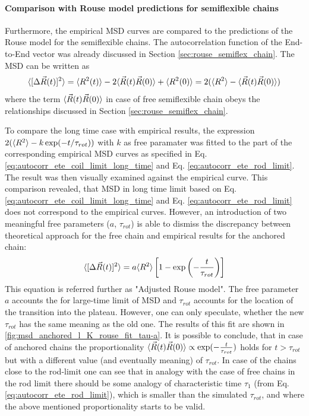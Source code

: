 \documentclass[
    paper=A4,pagesize=automedia,fontsize=12pt,
    BCOR=15mm,DIV=22,
    twoside,headinclude,footinclude=false,
    fleqn,             %
    bibliography=totocnumbered,          %
    listof=totoc,                %
    listof=flat,                 %
    cleardoublepage=empty      %
    numbers=endperiod
]{scrartcl}
\begin{document}
\FloatBarrier

\paragraph{Comparison with Rouse model predictions for semiflexible chains}
\label{sec:comp_with_rouse_semiflex}

Furthermore, the empirical MSD curves are compared to the predictions
of the Rouse model for the semiflexible chains. The autocorrelation function
of the End-to-End vector was already discussed in Section \ref{sec:rouse_semiflex_chain}.
The MSD can be written as 
$$\langle[\Delta \vec{R}(t)]^2\rangle = \langle R^2(t)\rangle - 2 \langle\vec{R}(t)\vec{R}(0)\rangle + \langle R^2(0)\rangle = 2(\langle R^2\rangle - \langle\vec{R}(t)\vec{R}(0)\rangle)$$
where the term $\langle\vec{R}(t)\vec{R}(0)\rangle$ in case of free semiflexible chain obeys 
the relationships discussed in Section \ref{sec:rouse_semiflex_chain}.

To compare the long time case with empirical results, the expression
$2(\langle R^2\rangle - k \exp(-t/\tau_{rot}))$ with $k$ as free paramater was fitted 
to the part of the corresponding empirical MSD curves as specified in 
Eq. \ref{eq:autocorr_ete_coil_limit_long_time} and Eq. \ref{eq:autocorr_ete_rod_limit}.
The result was then visually examined against the empirical curve.
This comparison revealed, that MSD in long time limit based on 
Eq. \ref{eq:autocorr_ete_coil_limit_long_time} and 
Eq. \ref{eq:autocorr_ete_rod_limit} does not correspond to the empirical curves.
However, an introduction of two meaningful free parameters 
($a$, $\tau_{rot}$) is able to dismiss
the discrepancy between theoretical approach for the free chain and empirical 
results for the anchored chain:
\begin{equation}
    \label{eq:adjusted_rouse_model_ete}
    \langle[\Delta \vec{R}(t)]^2\rangle  = a\langle R^2\rangle\left[1 - \exp\left(-\frac{t}{\tau_{rot}}\right)\right]
\end{equation}
This equation is referred further as "Adjusted Rouse model".
The free parameter $a$ accounts the for large-time limit of MSD and $\tau_{rot}$ 
accounts for the location of the transition into the plateau. However, one
can only speculate, whether the new $\tau_{rot}$ has the same meaning
as the old one. The results of this fit are shown in 
\autoref{fig:msd_anchored_l_K_rouse_fit_tau-a}.
It is possible to conclude, that in case of anchored chains the proportionality
$\langle\vec{R}(t)\vec{R}(0)\rangle \propto \exp(-\frac{t}{\tau_{rot}})$
holds for $t>\tau_{rot}$ but with a different value (and eventually meaning) of $\tau_{rot}$.
In case of the chains close to the rod-limit one can see that in analogy with 
the case of free chains in the rod limit there should be some analogy of 
characteristic time $\tau_1$ (from Eq. \ref{eq:autocorr_ete_rod_limit}), which 
is smaller than the simulated $\tau_{rot}$, and where the above mentioned 
proportionality starts to be valid.
\end{document}
